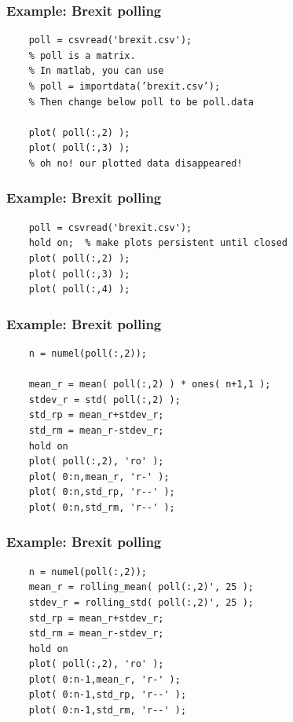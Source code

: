 \documentclass[11pt]{beamer}
\begin{document}
\begin{frame}[fragile]
	\frametitle{Example:  Brexit polling}
	
	\begin{Verbatim}
    poll = csvread('brexit.csv');
    % poll is a matrix. 
    % In matlab, you can use 
    % poll = importdata(’brexit.csv’);
    % Then change below poll to be poll.data
    
    plot( poll(:,2) );
    plot( poll(:,3) );
    % oh no! our plotted data disappeared!
	\end{Verbatim}
\end{frame}

\begin{frame}[fragile]
	\frametitle{Example:  Brexit polling}
	
	\begin{Verbatim}
    poll = csvread('brexit.csv');
    hold on;  % make plots persistent until closed
    plot( poll(:,2) );
    plot( poll(:,3) );
    plot( poll(:,4) );
	\end{Verbatim}
\end{frame}

\begin{frame}[fragile]
	\frametitle{Example:  Brexit polling}
	
	\begin{Verbatim}
    n = numel(poll(:,2));
    
    mean_r = mean( poll(:,2) ) * ones( n+1,1 );
    stdev_r = std( poll(:,2) );
    std_rp = mean_r+stdev_r;
    std_rm = mean_r-stdev_r;
    hold on
    plot( poll(:,2), 'ro' );
    plot( 0:n,mean_r, 'r-' );
    plot( 0:n,std_rp, 'r--' );
    plot( 0:n,std_rm, 'r--' );
	\end{Verbatim}
\end{frame}

\begin{frame}[fragile]
	\frametitle{Example:  Brexit polling}
	
	\begin{Verbatim}
    n = numel(poll(:,2));
    mean_r = rolling_mean( poll(:,2)', 25 );
    stdev_r = rolling_std( poll(:,2)', 25 );
    std_rp = mean_r+stdev_r;
    std_rm = mean_r-stdev_r;
    hold on
    plot( poll(:,2), 'ro' );
    plot( 0:n-1,mean_r, 'r-' );
    plot( 0:n-1,std_rp, 'r--' );
    plot( 0:n-1,std_rm, 'r--' );
	\end{Verbatim}
\end{frame}
\end{document}
